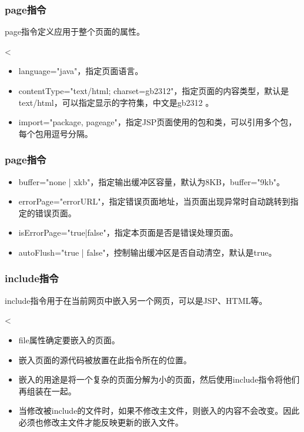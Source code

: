 \begin{frame}[fragile] %
  \frametitle{page指令}
  page指令定义应用于整个页面的属性。

  
  \begin{jspCode}
    <%
  \end{jspCode}

  
  \begin{itemize}
  \item language="java"，指定页面语言。
  \item contentType="text/html; charset=gb2312"，指定页面的内容类型，默认是text/html，可以指定显示的字符集，中文是gb2312 。
  \item import="package, pageage"，指定JSP页面使用的包和类，可以引用多个包，每个包用逗号分隔。
  \end{itemize}
\end{frame}

\begin{frame}[fragile] %
  \frametitle{page指令}

  
  \begin{itemize}
  \item buffer="none | xkb"，指定输出缓冲区容量，默认为8KB，buffer="9kb"。
  \item errorPage="errorURL"，指定错误页面地址，当页面出现异常时自动跳转到指定的错误页面。
  \item isErrorPage="true|false"，指定本页面是否是错误处理页面。
  \item autoFlush="true | false"，控制输出缓冲区是否自动清空，默认是true。
  \end{itemize}
\end{frame}

\begin{frame}[fragile] %
  \frametitle{include指令}

  include指令用于在当前网页中嵌入另一个网页，可以是JSP、HTML等。

  
  \begin{jspCode}
    <%
  \end{jspCode}

  
  \begin{itemize}
  \item file属性确定要嵌入的页面。
  \item 嵌入页面的源代码被放置在此指令所在的位置。
  \item 嵌入的用途是将一个复杂的页面分解为小的页面，然后使用include指令将他们再组装在一起。
  \item {\Red 当修改被include的文件时，如果不修改主文件，则嵌入的内容不会改变。因此必须也修改主文件才能反映更新的嵌入文件。}
  \end{itemize}
\end{frame}

